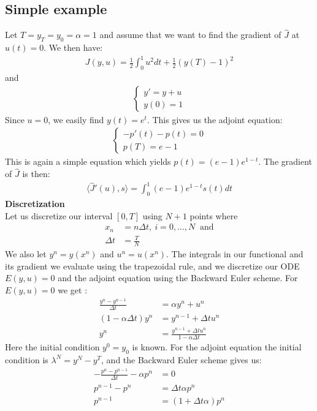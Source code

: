 \documentclass[11pt,a4paper]{article}
\begin{document}
\subsection{Simple example}
Let $T=y_T=y_0=\alpha=1$ and assume that we want to find the gradient of $\hat{J}$ at $u(t)=0$. We then have:
\begin{gather}
J(y,u) = \frac{1}{2}\int_0^1u^2dt + \frac{1}{2}(y(T)-1)^2
\end{gather} 
and
\begin{align}
\left\{
     \begin{array}{lr}
       	y' =  y +u\\
       	   y(0)=1
     \end{array}
   \right.
\end{align}
Since $u=0$, we easily find $y(t)=e^t$. This gives us the adjoint equation:
\begin{align}
   \left\{
     \begin{array}{lr}
       -p'(t) -p(t)=0  \\
       p(T) = e-1
     \end{array}
   \right.
\end{align}
This is again a simple equation which yields $p(t)=(e-1)e^{1-t}$. The gradient of $\hat{J}$ is then:
\begin{align*}
\langle\hat{J}'(u),s\rangle=\int_0^1(e-1)e^{1-t}s(t)dt
\end{align*}
\textbf{Discretization}
\\
Let us discretize our interval $[0,T]$ using $N+1$ points where 
\begin{align*}
x_n &= n\Delta t, \ i=0,...,N \ \text{ and} \\
\Delta t &= \frac{T}{N}
\end{align*}
We also let $y^n = y(x^n)$ and $u^n=u(x^n)$. The integrals in our functional and its gradient we evaluate using the trapezoidal rule, and we discretize our ODE $E(y,u)=0$ and the adjoint equation using the Backward Euler scheme. For $E(y,u)=0$ we get :
\begin{align*}
\frac{y^n-y^{n-1}}{\Delta t} &= \alpha y^{n} + u^{n} \\
(1-\alpha\Delta t)y^{n} &= y^{n-1} +\Delta t u^{n} \\
y^n &=\frac{y^{n-1} +\Delta t u^{n}}{1-\alpha\Delta t}
\end{align*} 
Here the initial condition $y^0=y_0$ is known. For the adjoint equation the initial condition is $\lambda^N = y^N-y^T $, and the Backward Euler scheme gives us:
\begin{align*}
-\frac{p^n-p^{n-1}}{\Delta t} -\alpha p^n &=0 \\
p^{n-1} -p^n &=\Delta t\alpha p^n \\
p^{n-1} &= (1+\Delta t\alpha)p^n
\end{align*}
\end{document}
